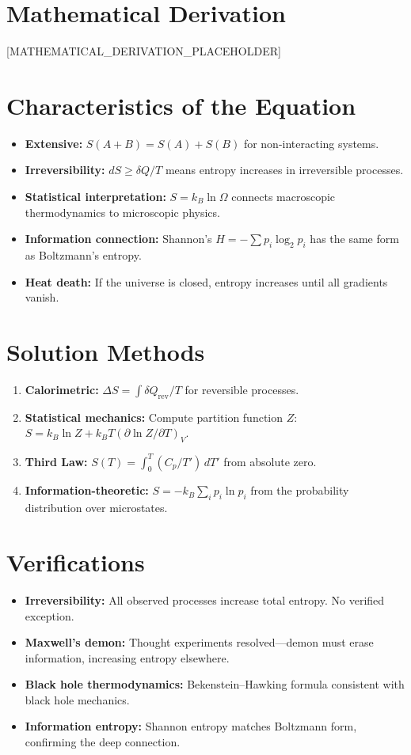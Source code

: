 \documentclass[11pt,openright]{book}
\begin{document}
\section*{Mathematical Derivation}

[MATHEMATICAL_DERIVATION_PLACEHOLDER]

\section*{Characteristics of the Equation}

\begin{itemize}
\item \textbf{Extensive:} $S(A + B) = S(A) + S(B)$ for non-interacting systems.
\item \textbf{Irreversibility:} $dS \geq \delta Q/T$ means entropy increases in irreversible processes.
\item \textbf{Statistical interpretation:} $S = k_B \ln \Omega$ connects macroscopic thermodynamics to microscopic physics.
\item \textbf{Information connection:} Shannon's $H = -\sum p_i \log_2 p_i$ has the same form as Boltzmann's entropy.
\item \textbf{Heat death:} If the universe is closed, entropy increases until all gradients vanish.
\end{itemize}
\section*{Solution Methods}

\begin{enumerate}
\item \textbf{Calorimetric:} $\Delta S = \int \delta Q_{\text{rev}} / T$ for reversible processes.
\item \textbf{Statistical mechanics:} Compute partition function $Z$: $S = k_B \ln Z + k_B T (\partial \ln Z / \partial T)_V$.
\item \textbf{Third Law:} $S(T) = \int_0^T (C_p / T') \, dT'$ from absolute zero.
\item \textbf{Information-theoretic:} $S = -k_B \sum_i p_i \ln p_i$ from the probability distribution over microstates.
\end{enumerate}
\section*{Verifications}

\begin{itemize}
\item \textbf{Irreversibility:} All observed processes increase total entropy. No verified exception.
\item \textbf{Maxwell's demon:} Thought experiments resolved---demon must erase information, increasing entropy elsewhere.
\item \textbf{Black hole thermodynamics:} Bekenstein--Hawking formula consistent with black hole mechanics.
\item \textbf{Information entropy:} Shannon entropy matches Boltzmann form, confirming the deep connection.
\end{itemize}
\end{document}
